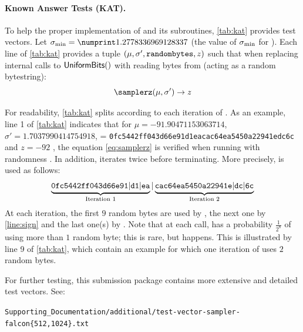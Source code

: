 \paragraph{Known Answer Tests (KAT).} To help the proper implementation of \longsamplerz and its subroutines, \cref{tab:kat} provides test vectors. Let $\sigmin = \sigminvali$ (the value of $\sigma_{\min}$ for ). Each line of \cref{tab:kat} provides a tuple $(\mu, \sigma', \texttt{randombytes}, z)$ such that when replacing internal calls to $\textsf{UniformBits}()$ with reading bytes from \randombytes (acting as a random bytestring):
\begin{equation}\label{eq:samplerz}
	 \samplerz(\mu, \sigma') \rightarrow z
\end{equation}

For readability, \cref{tab:kat} splits \randombytes according to each iteration of \samplerz. As an example, line 1 of \cref{tab:kat} indicates that for $\mu = -91.90471153063714$, $\sigma' = 1.7037990414754918$, \randombytes = {\small \texttt{0fc5442ff043d66e91d1eacac64ea5450a22941edc6c}} and $z = -92$ , the equation \eqref{eq:samplerz} is verified when running \samplerz with randomness \randombytes. In addition, \samplerz iterates twice before terminating. More precisely, \randombytes is used as follows:
\[
\underbrace{\tt 0fc5442ff043d66e91|d1|ea}_{\text{Iteration 1}}|
\underbrace{\tt cac64ea5450a22941e|dc|6c}_{\text{Iteration 2}}
\]
At each iteration, the first $9$ random bytes are used by \basesampler, the next one by \cref{line:sign} and the last one(s) by \berexp. Note that at each call, \berexp has a probability $\frac{1}{2^8}$ of using more than $1$ random byte; this is rare, but happens. This is illustrated by line 9 of \cref{tab:kat}, which contain an example for which one iteration of \berexp uses $2$ random bytes.

For further testing, this submission package contains more extensive and detailed test vectors. See:
\vspace{-4mm}
\begin{center}
{\small\tt Supporting\_Documentation/additional/test-vector-sampler-falcon\{512,1024\}.txt}
\end{center}


